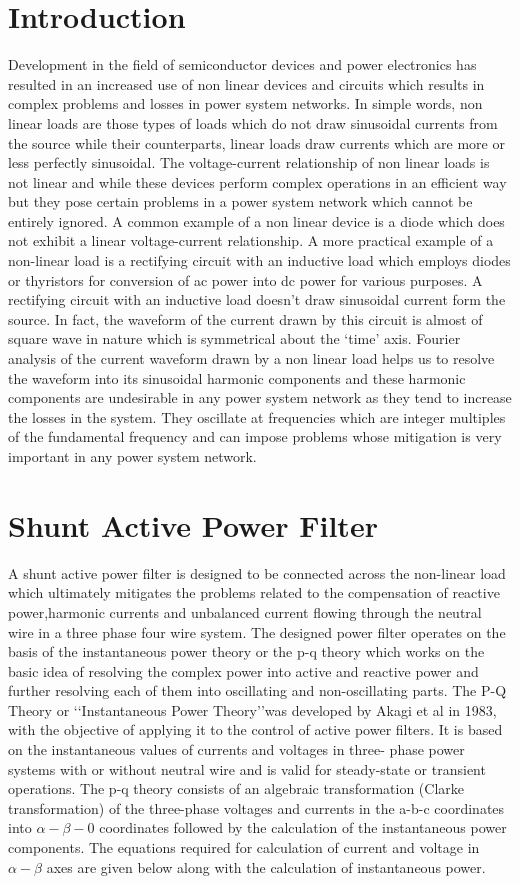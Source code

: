\documentclass[journal,twoside]{IEEEtran}
\begin{document}
	\section{Introduction}
Development in the field of semiconductor devices and power electronics has resulted in an increased use of non
linear devices and circuits which results in complex problems and losses in power system networks. In simple words, non
linear loads are those types of loads which do not draw sinusoidal currents from the source while their counterparts,
linear loads draw currents which are more or less perfectly sinusoidal. The voltage-current relationship of non linear loads
is not linear and while these devices perform complex operations in an efficient way but they pose certain problems
in a power system network which cannot be entirely ignored. A common example of a non linear device is a diode
which does not exhibit a linear voltage-current relationship. A more practical example of a non-linear load is a rectifying
circuit with an inductive load which employs diodes or thyristors for conversion of ac power into dc power for various
purposes. A rectifying circuit with an inductive load doesn’t draw sinusoidal current form the source. In fact, the waveform
of the current drawn by this circuit is almost of square wave in nature which is symmetrical about the ‘time’ axis.
Fourier analysis of the current waveform drawn by a non linear load helps us to resolve the waveform into its sinusoidal
harmonic components and these harmonic components are undesirable in any power system network as they tend to
increase the losses in the system. They oscillate at frequencies which are integer multiples of the fundamental frequency and
can impose problems whose mitigation is very important in any power system network.
	

\section{Shunt Active Power Filter}
A shunt active power filter is designed to be connected across the non-linear load which ultimately mitigates the
problems related to the compensation of reactive power,harmonic currents and unbalanced current flowing through the
neutral wire in a three phase four wire system. The designed power filter operates on the basis of the
instantaneous power theory or the p-q theory which works on the basic idea of resolving the complex power into active and
reactive power and further resolving each of them into oscillating and non-oscillating parts.
The P-Q Theory or \lq\lq Instantaneous Power Theory\rq\rq was developed by Akagi et al in 1983, with the objective of
applying it to the control of active power filters. It is based on the instantaneous values of currents and voltages in three-
phase power systems with or without neutral wire and is valid for steady-state or transient operations. The p-q theory consists
of an algebraic transformation (Clarke transformation) of the three-phase voltages and currents in the a-b-c coordinates into
$\alpha - \beta - 0$ coordinates followed by the calculation of the instantaneous power components.
The equations required for calculation of current and
voltage in $\alpha-\beta$ axes are given below along with the calculation
of instantaneous power. 
\end{document}
